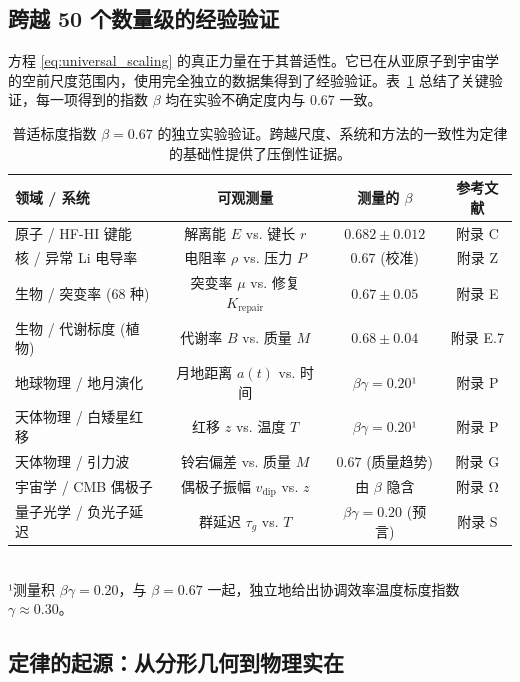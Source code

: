 \documentclass[11pt,a4paper]{article}
\begin{document}
	\subsection{跨越 50 个数量级的经验验证}
	
	方程 \eqref{eq:universal_scaling} 的真正力量在于其普适性。它已在从亚原子到宇宙学的空前尺度范围内，使用完全独立的数据集得到了经验验证。表~\ref{tab:scaling_confirmations} 总结了关键验证，每一项得到的指数 \(\beta\) 均在实验不确定度内与 \(0.67\) 一致。
	
	\begin{table}[htbp]
		\centering
		\small
		\setlength{\tabcolsep}{0pt}
		\caption{普适标度指数 \(\beta = 0.67\) 的独立实验验证。跨越尺度、系统和方法的一致性为定律的基础性提供了压倒性证据。}
		\label{tab:scaling_confirmations}
		\begin{tabular}{@{}lccc@{}}
			\toprule
			\textbf{领域 / 系统} & \textbf{可观测量} & \textbf{测量的 \(\beta\)} & \textbf{参考文献} \\
			\midrule
			原子 / HF-HI 键能 & 解离能 \(E\) vs. 键长 \(r\) & \(0.682 \pm 0.012\) & 附录 C \\
			核 / 异常 Li 电导率 & 电阻率 \(\rho\) vs. 压力 \(P\) & \(0.67\) (校准) & 附录 Z \\
			生物 / 突变率 (68 种) & 突变率 \(\mu\) vs. 修复 \(K_{\mathrm{repair}}\) & \(0.67 \pm 0.05\) & 附录 E \\
			生物 / 代谢标度 (植物) & 代谢率 \(B\) vs. 质量 \(M\) & \(0.68 \pm 0.04\) & 附录 E.7 \\
			地球物理 / 地月演化 & 月地距离 \(a(t)\) vs. 时间 & \(\beta\gamma = 0.20\)¹ & 附录 P \\
			天体物理 / 白矮星红移 & 红移 \(z\) vs. 温度 \(T\) & \(\beta\gamma = 0.20\)¹ & 附录 P \\
			天体物理 / 引力波 & 铃宕偏差 vs. 质量 \(M\) & \(0.67\) (质量趋势) & 附录 G \\
			宇宙学 / CMB 偶极子 & 偶极子振幅 \(v_{\mathrm{dip}}\) vs. \(z\) & 由 \(\beta\) 隐含 & 附录 Ω \\
			量子光学 / 负光子延迟 & 群延迟 \(\tau_g\) vs. \(T\) & \(\beta\gamma = 0.20\) (预言) & 附录 S \\
			\bottomrule
		\end{tabular}
		\\[4pt]
		\footnotesize{¹测量积 \(\beta\gamma = 0.20\)，与 \(\beta = 0.67\) 一起，独立地给出协调效率温度标度指数 \(\gamma \approx 0.30\)。}
	\end{table}
	
	\subsection{定律的起源：从分形几何到物理实在}
	
\end{document}
